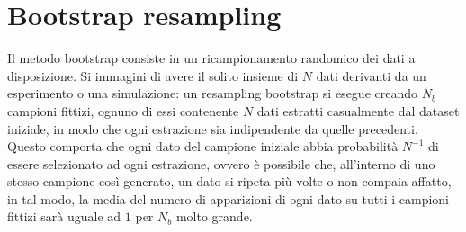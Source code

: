 \documentclass[LaM]{sapthesis}
\begin{document}
	\section{Bootstrap resampling}
	Il metodo bootstrap consiste in un ricampionamento randomico dei dati a disposizione. Si immagini di avere il solito insieme di $N$ dati derivanti da un esperimento o una simulazione: un resampling bootstrap si esegue creando $N_b$ campioni fittizi, ognuno di essi contenente $N$ dati estratti casualmente dal dataset iniziale, in modo che ogni estrazione sia indipendente da quelle precedenti. Questo comporta che ogni dato del campione iniziale abbia probabilità $N^{-1}$ di essere selezionato ad ogni estrazione, ovvero è possibile che, all'interno di uno stesso campione così generato, un dato si ripeta più volte o non compaia affatto, in tal modo, la media del numero di apparizioni di ogni dato su tutti i campioni fittizi sarà uguale ad $1$ per $N_b$ molto grande.
	
\end{document}
